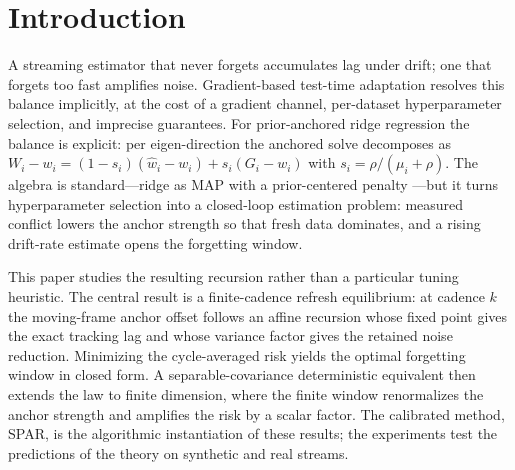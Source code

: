 \documentclass[10pt]{article}
\newcounter{algorithm}
\begin{document}
\section{Introduction}
A streaming estimator that never forgets accumulates lag under drift; one that forgets too fast amplifies noise.
Gradient-based test-time adaptation \citep{sun2020,wang2021tent} resolves this balance implicitly, at the cost of a gradient channel, per-dataset hyperparameter selection, and imprecise guarantees.
For prior-anchored ridge regression the balance is explicit: per eigen-direction the anchored solve decomposes as $W_i - w_i = (1-s_i)(\widehat w_i - w_i) + s_i(G_i - w_i)$ with $s_i = \rho/(\mu_i + \rho)$.
The algebra is standard---ridge as MAP with a prior-centered penalty \citep{hoerl1970,rasmussen2006,li2018l2sp}---but it turns hyperparameter selection into a closed-loop estimation problem: measured conflict lowers the anchor strength so that fresh data dominates, and a rising drift-rate estimate opens the forgetting window.

This paper studies the resulting recursion rather than a particular tuning heuristic.
The central result is a finite-cadence refresh equilibrium: at cadence $k$ the moving-frame anchor offset follows an affine recursion whose fixed point gives the exact tracking lag and whose variance factor gives the retained noise reduction.
Minimizing the cycle-averaged risk yields the optimal forgetting window in closed form.
A separable-covariance deterministic equivalent then extends the law to finite dimension, where the finite window renormalizes the anchor strength and amplifies the risk by a scalar factor.
The calibrated method, SPAR, is the algorithmic instantiation of these results; the experiments test the predictions of the theory on synthetic and real streams.
\end{document}
